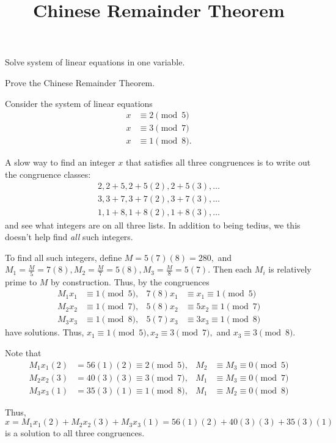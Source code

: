 \documentclass{ximera}
\title{Chinese Remainder Theorem}
\begin{document}
\begin{abstract}
\end{abstract}
\maketitle


\begin{obj}
\item Solve system of linear equations in one variable.
 \item Prove the Chinese Remainder Theorem.
\end{obj}





\begin{example}
    Consider the system of linear equations 
    \begin{align*}
        x &\equiv 2 \pmod{5}\\
        x &\equiv 3 \pmod{7}\\
        x &\equiv 1 \pmod{8}.
    \end{align*}

    A slow way to find an integer $x$ that satisfies all three congruences is to write out the congruence classes:
    \begin{align*}
        2, 2+5, 2+5(2), \boxed{2+5(3)}, \dots\\
        3, 3+7, \boxed{3+7(2)}, 3+7(3), \dots\\
        1, 1+8, 1+8(2), \boxed{1+8(3)}, \dots
    \end{align*}
    and see what integers are on all three lists. In addition to being tedius, we this doesn't help find \emph{all} such integers.

    To find all such integers, define $M=5(7)(8)=280,$ and $M_1=\frac{M}{5}=7(8),M_2=\frac{M}{7}=5(8),M_3=\frac{M}{8}=5(7).$ Then each $M_i$ is relatively prime to $M$ by construction. Thus, by  the congruences
    \begin{align*}
        M_1x_1 & \equiv 1\pmod 5, & 7(8)x_1&\equiv x_1 \equiv 1\pmod 5\\
        M_2x_2 & \equiv 1\pmod 7, & 5(8)x_2 &\equiv 5x_2 \equiv 1\pmod 7\\
        M_3x_3 & \equiv 1\pmod 8, & 5(7)x_3&\equiv 3x_3\equiv 1\pmod 8
    \end{align*}
    have solutions. Thus, $x_1\equiv 1\pmod{5}, x_2\equiv 3\pmod{7},$ and $x_3\equiv 3\pmod{8}.$

    Note that 
    \begin{align*}
        M_1x_1(2)&=56(1)(2)\equiv 2\pmod 5, & M_2&\equiv M_3\equiv 0\pmod{5}\\
        M_2x_2(3)&=40(3)(3)\equiv 3\pmod 7, & M_1&\equiv M_3\equiv 0\pmod{7}\\
        M_3x_3(1)&=35(3)(1)\equiv 1\pmod 8, & M_1&\equiv M_2\equiv 0\pmod{8}
    \end{align*}

    Thus, \[x=M_1x_1(2)+M_2x_2(3)+M_3x_3(1)=56(1)(2)+40(3)(3)+35(3)(1)\]
    is a solution to all three congruences.
\end{example}
\end{document}
